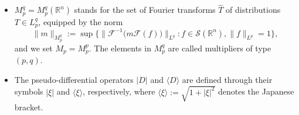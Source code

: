 \documentclass[10pt]{article}
\newcommand{\<}{\langle}
\renewcommand{\>}{\rangle}
\numberwithin{equation}{section}
\newcommand{\R}{{\mathbb{R}}}
\begin{document}
\begin{itemize}
\item $M_p^q = M_p^q(\mathbb{R}^n)$ stands for the set of Fourier transforms $\hat{T}$ of distributions $T\in L_p^q$, equipped by the norm
\[ \|m\|_{M_p^q} := \sup\big\{ \big\| \mathcal{F}^{-1}\big( m\mathcal{F}(f) \big) \big\|_{L^q}: f\in\mathcal{S}(\R^n), \|f\|_{L^p} = 1 \big\}, \]
and we set $M_p = M_p^p$. The elements in $ M_p^q$ are called multipliers of type $(p,q)$.

\item The pseudo-differential operators $|D|$ and $\langle D\rangle$ are defined through their symbols $|\xi|$ and $\langle\xi\rangle$, respectively, where $
\langle\xi\rangle := \sqrt{1+|\xi|^2}$ denotes the Japanese bracket.
\end{itemize}
%
\end{document}
